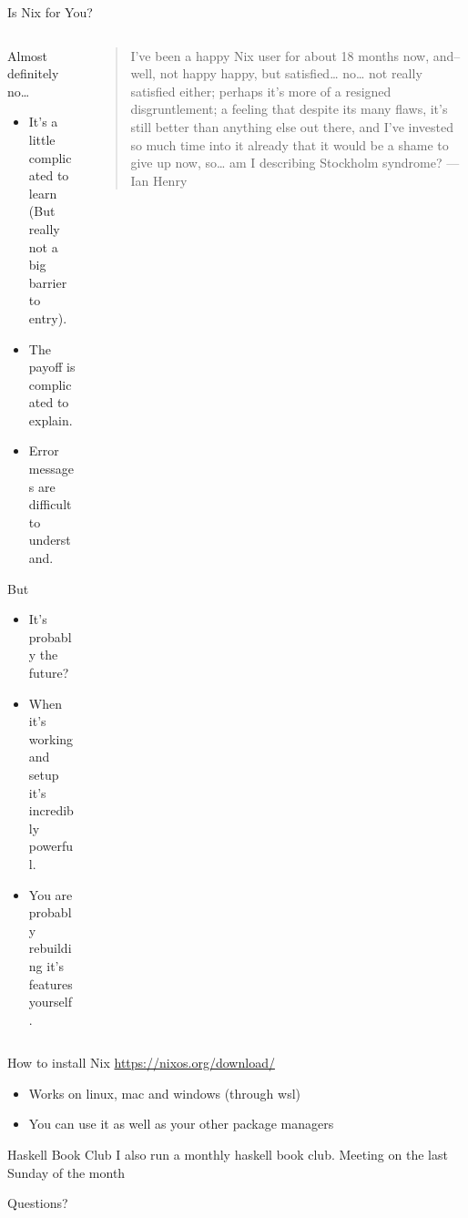 \documentclass[smaller,aspectratio=169]{beamer}
\begin{document}
\begin{frame}[label={sec:org46532f6}]{Is Nix for You?}
\begin{columns}
\begin{column}{0.45\columnwidth}
Almost definitely no\ldots{}
\begin{itemize}
\item It's a little complicated to learn (But really not a big barrier to entry).
\item The payoff is complicated to explain.
\item Error messages are difficult to understand.
\end{itemize}
But
\begin{itemize}
\item It's probably the future?
\item When it's working and setup it's incredibly powerful.
\item You are probably rebuilding it's features yourself.
\end{itemize}
\end{column}
\begin{column}{0.45\columnwidth}
\begin{quote}
I’ve been a happy Nix user for about 18 months now, and– well, not happy happy, but satisfied… no… not really satisfied either; perhaps it’s more of a resigned disgruntlement; a feeling that despite its many flaws, it’s still better than anything else out there, and I’ve invested so much time into it already that it would be a shame to give up now, so… am I describing Stockholm syndrome?
--- Ian Henry
\end{quote}
\end{column}
\end{columns}
\end{frame}
\begin{frame}[label={sec:orgd4c0726}]{How to install Nix}
\url{https://nixos.org/download/}

\begin{itemize}
\item Works on linux, mac and windows (through wsl)
\item You can use it as well as your other package managers
\end{itemize}
\end{frame}
\begin{frame}[label={sec:org1095588}]{Haskell Book Club}
I also run a monthly haskell book club. Meeting on the last Sunday of the month
\end{frame}
\begin{frame}[label={sec:orgc03cf00}]{Questions?}
\end{frame}
\end{document}
